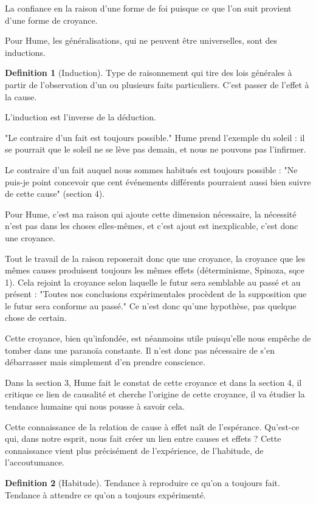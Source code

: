 \documentclass[french]{book}
\theoremstyle{definition}
\newtheorem*{dfn}{Definition}
\begin{document}
La confiance en la raison d'une forme de foi puisque ce que l'on suit provient d'une forme de croyance.

Pour Hume, les généralisations, qui ne peuvent être universelles, sont des inductions.

\begin{dfn}[Induction]
Type de raisonnement qui tire des lois générales à partir de l'observation d'un ou plusieurs faits particuliers. C'est passer de l'effet à la cause.
\end{dfn}

L’induction est l’inverse de la déduction.

"Le contraire d'un fait est toujours possible." Hume prend l'exemple du soleil : il se pourrait que le soleil ne se lève pas demain, et nous ne pouvons pas l'infirmer.

Le contraire d'un fait auquel nous sommes habitués est toujours possible : "Ne puis-je point concevoir que cent événements différents pourraient aussi bien suivre de cette cause" (section 4).

Pour Hume, c'est ma raison qui ajoute cette dimension nécessaire, la nécessité n'est pas dans les choses elles-mêmes, et c'est ajout est inexplicable, c'est donc une croyance.

Tout le travail de la raison reposerait donc que une croyance, la croyance que les mêmes causes produisent toujours les mêmes effets (déterminisme, Spinoza, sqce 1). Cela rejoint la croyance selon laquelle le futur sera semblable au passé et au présent : "Toutes nos conclusions expérimentales procèdent de la supposition que le futur sera conforme au passé." Ce n'est donc qu'une hypothèse, pas quelque chose de certain.

Cette croyance, bien qu'infondée, est néanmoins utile puisqu'elle nous empêche de tomber dans une paranoïa constante. Il n'est donc pas nécessaire de s'en débarrasser mais simplement d'en prendre conscience.

Dans la section 3, Hume fait le constat de cette croyance et dans la section 4, il critique ce lien de causalité et cherche l'origine de cette croyance, il va étudier la tendance humaine qui nous pousse à savoir cela.

Cette connaissance de la relation de cause à effet naît de l'espérance. Qu'est-ce qui, dans notre esprit, nous fait créer un lien entre causes et effets ? Cette connaissance vient plus précisément de l'expérience, de l'habitude, de l'accoutumance.


\begin{dfn}[Habitude]
	Tendance à reproduire ce qu'on a toujours fait.
Tendance à attendre ce qu'on a toujours expérimenté.
\end{dfn}
\end{document}
